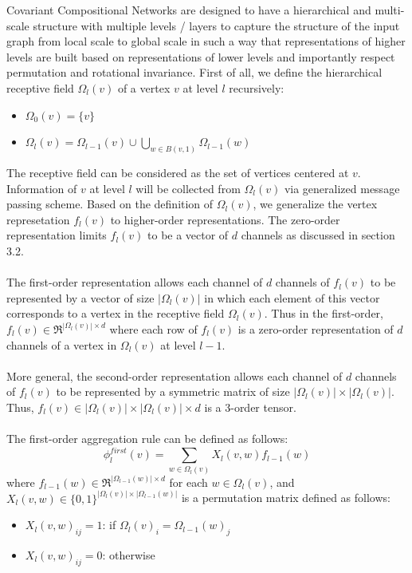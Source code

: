 \documentclass[a4paper]{article}
\begin{document}
Covariant Compositional Networks are designed to have a hierarchical and multi-scale structure with multiple levels / layers to capture the structure of the input graph from local scale to global scale in such a way that representations of higher levels are built based on representations of lower levels and importantly respect permutation and rotational invariance. First of all, we define the hierarchical receptive field $\Omega_l(v)$ of a vertex $v$ at level $l$ recursively:
\begin{itemize}
	\item $\Omega_0(v) = \{v\}$
	\item $\Omega_l(v) = \Omega_{l - 1}(v) \cup \bigcup_{w \in B(v, 1)} \Omega_{l - 1}(w)$
\end{itemize} 
The receptive field can be considered as the set of vertices centered at $v$. Information of $v$ at level $l$ will be collected from $\Omega_l(v)$ via generalized message passing scheme. Based on the definition of $\Omega_l(v)$, we generalize the vertex represetation $f_l(v)$ to higher-order representations. The zero-order representation limits $f_l(v)$ to be a vector of $d$ channels as discussed in section 3.2. \\ \\
The first-order representation allows each channel of $d$ channels of $f_l(v)$ to be represented by a vector of size $|\Omega_l(v)|$ in which each element of this vector corresponds to a vertex in the receptive field $\Omega_l(v)$. Thus in the first-order, $f_l(v) \in \Re^{|\Omega_l(v)| \times d}$ where each row of $f_l(v)$ is a zero-order representation of $d$ channels of a vertex in $\Omega_{l}(v)$ at level $l - 1$. \\ \\
More general, the second-order representation allows each channel of $d$ channels of $f_l(v)$ to be represented by a symmetric matrix of size $|\Omega_l(v)| \times |\Omega_l(v)|$. Thus, $f_l(v) \in |\Omega_l(v)| \times |\Omega_l(v)| \times d$ is a 3-order tensor. \\ \\
The first-order aggregation rule can be defined as follows:
$$\phi_l^{first}(v) = \sum\limits_{w \in \Omega_l(v)} X_l(v, w) f_{l - 1}(w)$$
where $f_{l - 1}(w) \in \Re^{|\Omega_{l - 1}(w)| \times d}$ for each $w \in \Omega_l(v)$, and $X_l(v, w) \in \{0, 1\}^{|\Omega_l(v)| \times |\Omega_{l - 1}(w)|}$ is a permutation matrix defined as follows:
\begin{itemize}
	\item $X_l(v, w)_{ij} = 1$: if $\Omega_l(v)_i = \Omega_{l - 1}(w)_j$
	\item $X_l(v, w)_{ij} = 0$: otherwise
\end{itemize}
\end{document}
